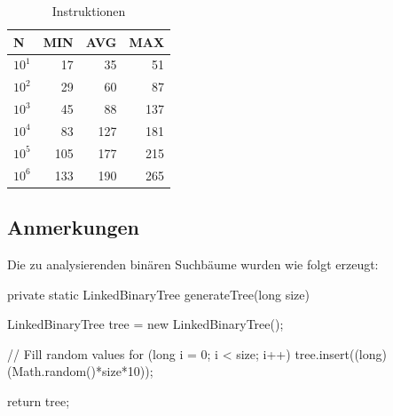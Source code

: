 \documentclass[paper=a4, fontsize=12pt]{article}
\begin{document}
\begin{table}[H]
	\centering
	\begin{tabular}{ l | r | r | r }
		\textbf{N} & \textbf{MIN} & \textbf{AVG} & \textbf{MAX}\\
		\hline\hline
		$10^1$	&	17 & 35 & 51	\\ \hline
		$10^2$	& 29 & 60	& 87	\\ \hline
		$10^3$	& 45 & 88 & 137	\\ \hline
		$10^4$	& 83 & 127 & 181 \\ \hline
		$10^5$	& 105 & 177 & 215	\\ \hline
		$10^6$	& 133 & 190	& 265 \\ \hline
	\end{tabular}
	\caption{Instruktionen }
\end{table}

\subsection{Anmerkungen}
Die zu analysierenden binären Suchbäume wurden wie folgt erzeugt:

\begin{javacode}
private static LinkedBinaryTree generateTree(long size) {
	LinkedBinaryTree tree = new LinkedBinaryTree();
	
	// Fill random values
	for (long i = 0; i < size; i++) {
		tree.insert((long) (Math.random()*size*10));
	}
	
	return tree;
}
\end{javacode}
\end{document}
